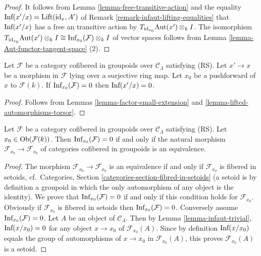 \begin{proof}
It follows from Lemma \ref{lemma-free-transitive-action} and the equality 
$\textnormal{Inf}(x'/x) = \textnormal{Lift}(\textnormal{id}_{x}, A')$ of Remark 
\ref{remark-infaut-lifting-equalities} that $\textnormal{Inf}(x'/x)$ has a free 
an transitive action by $T_{\textnormal{id}_{x_0}} \textnormal{Aut}(x') 
\otimes_{k} I$.  The isomorphism $T_{\textnormal{id}_{x_0}} 
\textnormal{Aut}(x') \otimes_{k} I \cong \textnormal{Inf}_{x_0}(\mathcal F) 
\otimes_{k} I$ of vector spaces follows from Lemma 
\ref{lemma-Aut-functor-tangent-space} (2).
\end{proof}

\begin{lemma}
\label{lemma-infaut-trivial}
Let $\mathcal F$ be a category cofibered in groupoids over $\mathcal 
C_{\Lambda}$ satisfying \textnormal{(RS)}. Let $x' \rightarrow x$ be a morphism 
in $\mathcal F$ lying over a surjective ring map.  Let $x_0$ be a pushforward 
of $x$ to $\mathcal F(k)$.  If $\textnormal{Inf}_{x_0}(\mathcal F) = 0$ then 
$\textnormal{Inf}(x'/x) = 0$.
\end{lemma}

\begin{proof}
Follows from Lemmas \ref{lemma-factor-small-extension} and 
\ref{lemma-lifted-automorphisms-torsor}.
\end{proof}

\begin{lemma}
\label{lemma-infdef-trivial}
Let $\mathcal F$ be a category cofibered in groupoids over $\mathcal 
C_{\Lambda}$ satisfying (RS). Let $x_0 \in \textnormal{Ob}(\mathcal F(k))$. 
Then $\textnormal{Inf}_{x_0}(\mathcal F) = 0$ if and only if the natural 
morphism $\mathcal F_{x_0} \rightarrow \overline{\mathcal F_{x_0}}$ of 
categories cofibered in groupoids is an equivalence.
\end{lemma}

\begin{proof}
The morphism $\mathcal F_{x_0} \rightarrow \overline{\mathcal F_{x_0}}$ is an 
equivalence if and only if $\mathcal F_{x_0}$ is fibered in setoids,
cf.\ Categories, Section \ref{categories-section-fibred-in-setoids}
(a setoid is by definition a groupoid in 
which the only automorphism of any object is the identity).  We prove that 
$\textnormal{Inf}_{x_0}(\mathcal F) = 0$ if and only if this condition holds 
for $\mathcal F_{x_0}$.  Obviously if $\mathcal F_{x_0}$ is fibered in setoids 
then $\textnormal{Inf}_{x_0}(\mathcal F) = 0$.  Conversely assume 
$\textnormal{Inf}_{x_0}(\mathcal F) = 0$.  Let $A$ be an object of $\mathcal 
C_{\Lambda}$. Then by Lemma \ref{lemma-infaut-trivial}, 
$\textnormal{Inf}(x/x_0) = 0$ for any object $x \rightarrow x_0$ of $\mathcal 
F_{x_0}(A)$. Since by definition $\textnormal{Inf}(x/x_0)$ equals the group of 
automorphisms of $x \rightarrow x_0$ in $\mathcal F_{x_0}(A)$, this proves 
$\mathcal F_{x_0}(A)$ is a setoid.
\end{proof}

